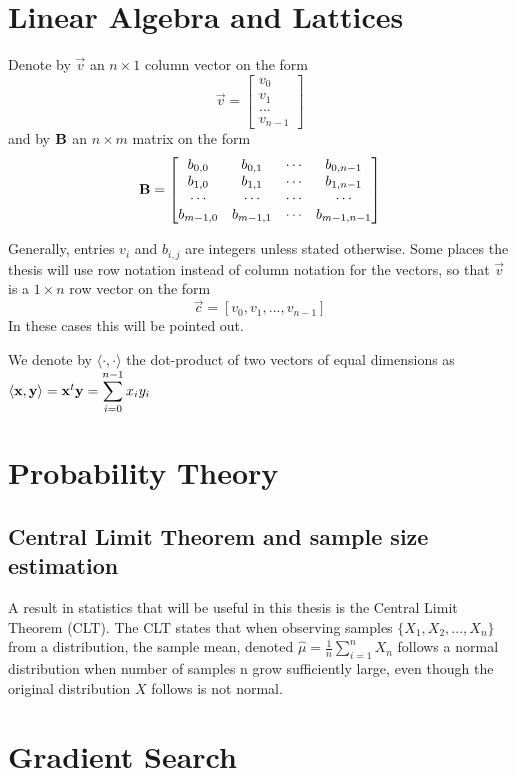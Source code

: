 \section{Linear Algebra and Lattices}
Denote by $\vec{v}$ an $n \times 1$ column vector on the form 
\[ \vec{v} = \begin{bmatrix} v_0 \\ v_1 \\ ... \\ v_{n-1} \end{bmatrix}\] and by $\mathbf{B}$ an $n \times m$ matrix on the form 
\[
    \mathbf{B} = 
    \begin{bmatrix}
        b_{0,0} & b_{0,1} & \cdots & b_{0, n-1} \\ 
        b_{1,0} & b_{1,1} & \cdots & b_{1, n-1} \\ 
        \cdots & \cdots & \cdots & \cdots\\
        b_{m-1,0} & b_{m-1,1} & \cdots & b_{m-1, n-1} \\ 
    \end{bmatrix}
\]

Generally, entries $v_i$ and $b_{i, j}$ are integers unless stated otherwise.
Some places the thesis will use row notation instead of column notation for the vectors, so that $\vec{v}$ is a $1 \times n$ row vector on the form
\[\vec{c} = [v_0, v_1, ..., v_{n-1}]\] In these cases this will be pointed out.

We denote by $\langle \cdot, \cdot \rangle$ the dot-product of two vectors of equal dimensions as \\
$\langle \vec{x}, \vec{y} \rangle = \vec{x}^t \vec{y} = \mathlarger{\sum_{i=0}^{n-1} x_i y_i}$
\section{Probability Theory}
\subsection{Central Limit Theorem and sample size estimation}
A result in statistics that will be useful in this thesis is the Central Limit Theorem (CLT).
The CLT states that when observing samples $\{X_1, X_2, ..., X_n\}$ from a distribution, the sample mean, denoted $\hat{\mu} = \frac{1}{n} \sum_{i=1}^{n} X_n$ follows a normal distribution 
when number of samples n grow sufficiently large, even though the original distribution $X$ follows is not normal.

\section{Gradient Search}
